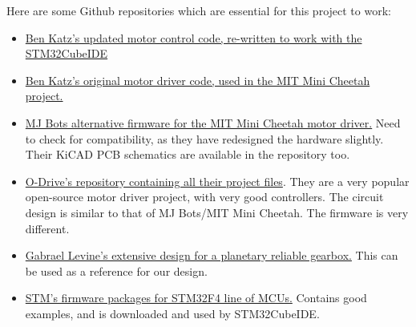 \documentclass[a4paper]{article}
\begin{document}
		Here are some Github repositories which are essential for this project to work:
		\begin{itemize}
			\item \href{https://github.com/bgkatz/motorcontrol}{Ben Katz's updated motor control code, re-written to work with the STM32CubeIDE}
			\item \href{https://github.com/bgkatz/3phase_integrated}{Ben Katz's original motor driver code, used in the MIT Mini Cheetah project.}
			\item \href{https://github.com/mjbots/moteus}{MJ Bots alternative firmware for the MIT Mini Cheetah motor driver.} Need to check for compatibility, as they have redesigned the hardware slightly. Their KiCAD PCB schematics are available in the repository too.
			\item \href{https://github.com/odriverobotics/ODrive}{O-Drive's repository containing all their project files}. They are a very popular open-source motor driver project, with very good controllers. The circuit design is similar to that of MJ Bots/MIT Mini Cheetah. The firmware is very different.
			\item \href{https://github.com/G-Levine/OpenTorque-Actuator}{Gabrael Levine's extensive design for a planetary reliable gearbox.} This can be used as a reference for our design.
			\item \href{https://github.com/STMicroelectronics/STM32CubeF4}{STM's firmware packages for STM32F4 line of MCUs.} Contains good examples, and is downloaded and used by STM32CubeIDE.
		\end{itemize}
\end{document}
